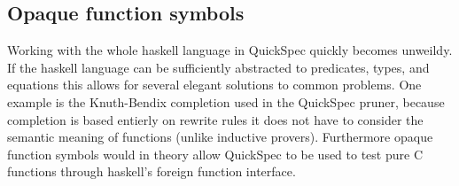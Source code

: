     \subsection{Opaque function symbols}
    Working with the whole haskell language in QuickSpec quickly becomes unweildy.
    If the haskell language can be sufficiently abstracted to predicates, types, and
    equations this allows for several elegant solutions to common problems. One
    example is the Knuth-Bendix completion used in the QuickSpec pruner, because
    completion is based entierly on rewrite rules it does not have to consider
    the semantic meaning of functions (unlike inductive provers). Furthermore
    opaque function symbols would in theory allow QuickSpec to be used to test
    pure C functions through haskell's foreign function interface.
